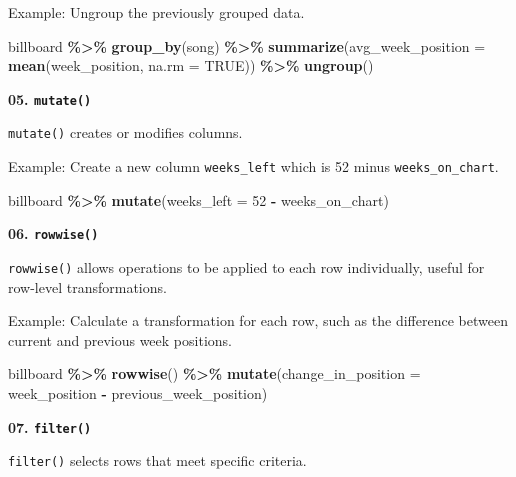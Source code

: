 \documentclass[
]{book}
\newenvironment{Shaded}{\begin{snugshade}}{\end{snugshade}}
\newcommand{\AttributeTok}[1]{\textcolor[rgb]{0.13,0.29,0.53}{#1}}
\newcommand{\ConstantTok}[1]{\textcolor[rgb]{0.56,0.35,0.01}{#1}}
\newcommand{\DecValTok}[1]{\textcolor[rgb]{0.00,0.00,0.81}{#1}}
\newcommand{\FunctionTok}[1]{\textcolor[rgb]{0.13,0.29,0.53}{\textbf{#1}}}
\newcommand{\NormalTok}[1]{#1}
\newcommand{\SpecialCharTok}[1]{\textcolor[rgb]{0.81,0.36,0.00}{\textbf{#1}}}
\begin{document}
Example: Ungroup the previously grouped data.

\begin{Shaded}
\begin{Highlighting}[]
\NormalTok{billboard }\SpecialCharTok{\%\textgreater{}\%}
  \FunctionTok{group\_by}\NormalTok{(song) }\SpecialCharTok{\%\textgreater{}\%}
  \FunctionTok{summarize}\NormalTok{(}\AttributeTok{avg\_week\_position =} \FunctionTok{mean}\NormalTok{(week\_position, }\AttributeTok{na.rm =} \ConstantTok{TRUE}\NormalTok{)) }\SpecialCharTok{\%\textgreater{}\%}
  \FunctionTok{ungroup}\NormalTok{()}
\end{Highlighting}
\end{Shaded}

\textbf{05. \texttt{mutate()}}

\texttt{mutate()} creates or modifies columns.

Example: Create a new column \texttt{weeks\_left} which is 52 minus \texttt{weeks\_on\_chart}.

\begin{Shaded}
\begin{Highlighting}[]
\NormalTok{billboard }\SpecialCharTok{\%\textgreater{}\%}
  \FunctionTok{mutate}\NormalTok{(}\AttributeTok{weeks\_left =} \DecValTok{52} \SpecialCharTok{{-}}\NormalTok{ weeks\_on\_chart)}
\end{Highlighting}
\end{Shaded}

\textbf{06. \texttt{rowwise()}}

\texttt{rowwise()} allows operations to be applied to each row individually, useful for row-level transformations.

Example: Calculate a transformation for each row, such as the difference between current and previous week positions.

\begin{Shaded}
\begin{Highlighting}[]
\NormalTok{billboard }\SpecialCharTok{\%\textgreater{}\%}
  \FunctionTok{rowwise}\NormalTok{() }\SpecialCharTok{\%\textgreater{}\%}
  \FunctionTok{mutate}\NormalTok{(}\AttributeTok{change\_in\_position =}\NormalTok{ week\_position }\SpecialCharTok{{-}}\NormalTok{ previous\_week\_position)}
\end{Highlighting}
\end{Shaded}

\textbf{07. \texttt{filter()}}

\texttt{filter()} selects rows that meet specific criteria.
\end{document}
